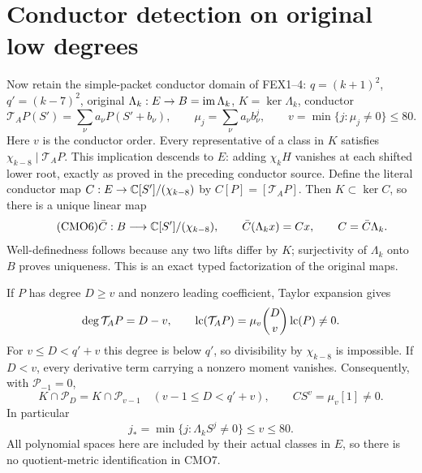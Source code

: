 \section{Conductor detection on original low degrees}
Now retain the simple-packet conductor domain of FEX1--4:
$q=(k+1)^2$, $q'=(k-7)^2$, original $\Lambda_k:E\to B=\operatorname{im}\Lambda_k$,
$K=\ker\Lambda_k$, conductor
\[
 \mathcal T_AP(S')=\sum_{\nu}a_\nu P(S'+b_\nu),\qquad
 \mu_j=\sum_\nu a_\nu b_\nu^j,\qquad
 v=\min\{j:\mu_j\ne0\}\le80 .
\]
Here $v$ is the conductor order. Every representative of a class
in $K$ satisfies $\chi_{k-8}\mid\mathcal T_AP$.
This implication descends to $E$: adding $\chi_kH$ vanishes
at each shifted lower root, exactly as proved in the preceding
conductor source.
Define the literal conductor map
$C:E\to\mathbb C[S']/(\chi_{k-8})$ by $C[P]=[\mathcal T_AP]$.
Then $K\subset\ker C$, so there is a unique linear map
\begin{equation}\tag{CMO6}
 \bar C:B\longrightarrow\mathbb C[S']/(\chi_{k-8}),\qquad
 \bar C(\Lambda_kx)=Cx,\qquad C=\bar C\Lambda_k .
\end{equation}
Well-definedness follows because any two lifts differ by $K$;
surjectivity of $\Lambda_k$ onto $B$ proves uniqueness.
This is an exact typed factorization of the original maps.

If $P$ has degree $D\ge v$ and nonzero leading coefficient,
Taylor expansion gives
\[
 \deg\mathcal T_AP=D-v,\qquad
 \operatorname{lc}(\mathcal T_AP)=\mu_v\binom Dv\operatorname{lc}(P)\ne0 .
\]
For $v\le D<q'+v$ this degree is below $q'$, so
divisibility by $\chi_{k-8}$ is impossible.
If $D<v$, every derivative term carrying a nonzero moment
vanishes. Consequently, with $\mathcal P_{-1}=0$,
\begin{equation}\tag{CMO7}
 K\cap\mathcal P_D=K\cap\mathcal P_{v-1}
 \quad(v-1\le D<q'+v),\qquad
 CS^v=\mu_v[1]\ne0 .
\end{equation}
In particular
\begin{equation}\tag{CMO8}
 j_*=\min\{j:\Lambda_k S^j\ne0\}\le v\le80 .
\end{equation}
All polynomial spaces here are included by their actual classes
in $E$, so there is no quotient-metric identification in CMO7.

